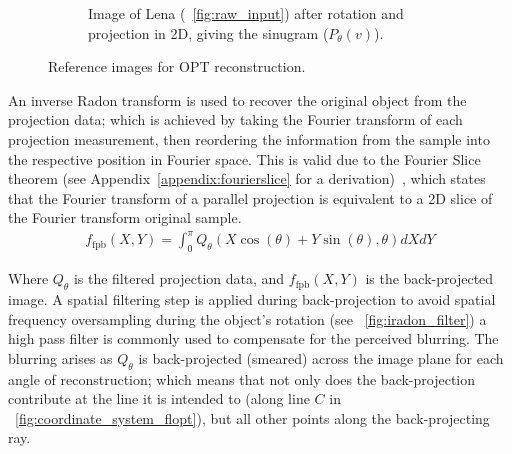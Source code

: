 \begin{figure}
\begin{subfigure}[t]{0.4\textwidth}
    \caption{Image of Lena (\figurename~\ref{fig:raw_input}) after rotation and projection in 2D, giving the sinugram (\(P_{\theta}(v)\)).
    }\label{fig:sinugram_stretch}
  \end{subfigure}
  \caption{Reference images for OPT reconstruction.}\label{fig:rawinputs}
\end{figure}


An inverse \gls{Radon transform} is used to recover the original object from the projection data; which is achieved by taking the \gls{Fourier transform} of each projection measurement, then reordering the information from the sample into the respective position in Fourier space.
This is valid due to the Fourier Slice theorem (see Appendix~\ref{appendix:fourierslice} for a derivation)~\cite{bracewellStripIntegrationRadio1956}, which states that the \gls{Fourier transform} of a parallel projection is equivalent to a 2D slice of the Fourier transform original sample.
\begin{align}
f_{\text{fpb}}(X,Y) = \int_{0}^{\pi} Q_\theta (X\cos(\theta)+Y\sin(\theta),\theta)dXdY
\end{align}

Where \(Q_\theta\) is the filtered projection data, and \(f_{\text{fpb}}(X,Y)\) is the back-projected image.
A spatial filtering step is applied during back-projection to avoid spatial frequency oversampling during the object’s rotation (see \figurename~\ref{fig:iradon_filter})
a high pass filter is commonly used to compensate for the perceived blurring.
The blurring arises as \(Q_\theta \) is back-projected (smeared) across the \gls{image plane} for each angle of reconstruction; which means that not only does the back-projection contribute at the line it is intended to (along line \(C\) in \figurename~\ref{fig:coordinate_system_flopt}), but all other points along the back-projecting ray.

